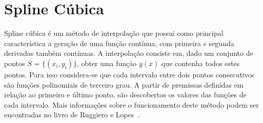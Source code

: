 \section{Spline Cúbica} \label{conceitoSpline}

	Spline cúbica é um método de interpolação que possui como principal característica a geração de uma função contínua, com primeira e segunda derivadas também contínuas. A interpolação consiste em, dado um conjunto de pontos $S$ = $\{(x_i,y_i)\}$, obter uma função $y(x)$ que contenha todos estes pontos. Para isso considera-se que cada intervalo entre dois pontos consecutivos são funções polinomiais de terceiro grau. A partir de premissas definidas em relação ao primeiro e último ponto, são descobertos os valores das funções de cada intervalo. Mais informações sobre o funcionamento deste método podem ser encontradas no livro de Ruggiero e Lopes~\cite{livroCalculoNumerico}.
	
	
	
	
